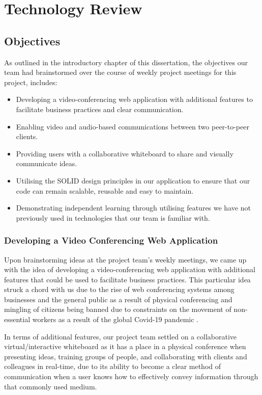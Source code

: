 \chapter{Technology Review}
\section{Objectives}
\label{objectives}
As outlined in the introductory chapter of this dissertation, the objectives our team had brainstormed over the course of weekly project meetings for this project, includes: 
\begin{itemize}
\item Developing a video-conferencing web application with additional features to facilitate business practices and clear communication.
\item Enabling video and audio-based communications between two peer-to-peer clients.
\item Providing users with a collaborative whiteboard to share and visually communicate ideas.
\item Utilising the SOLID design principles in our application to ensure that our code can remain scalable, reusable and easy to maintain.
\item Demonstrating independent learning through utilising features we have not previously used in technologies that our team is familiar with.
\end{itemize}

\subsection{Developing a Video Conferencing Web Application}
Upon brainstorming ideas at the project team’s weekly meetings, we came up with the idea of developing a video-conferencing web application with additional features that could be used to facilitate business practices. This particular idea struck a chord with us due to the rise of web conferencing systems among businesses and the general public as a result of physical conferencing and mingling of citizens being banned due to constraints on the movement of non-essential workers as a result of the global Covid-19 pandemic \cite{hacker2020virtually}. 

In terms of additional features, our project team settled on a collaborative virtual/interactive whiteboard as it has a place in a physical conference when presenting ideas, training groups of people, and collaborating with clients and colleagues in real-time, due to its ability to become a clear method of communication when a user knows how to effectively convey information through that commonly used medium.

